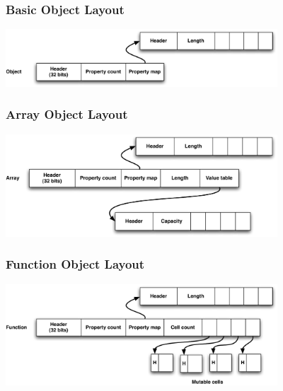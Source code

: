 \begin{frame}
\frametitle{\bf Basic Object Layout}

\begin{center}
\includegraphics[width=4in]{images/obj_layout_basic}
\end{center}
\end{frame}

\begin{frame}
\frametitle{\bf Array Object Layout}

\begin{center}
\includegraphics[width=4in]{images/obj_layout_array}
\end{center}
\end{frame}

\begin{frame}
\frametitle{\bf Function Object Layout}

\begin{center}
\includegraphics[width=4in]{images/obj_layout_func}
\end{center}
\end{frame}


